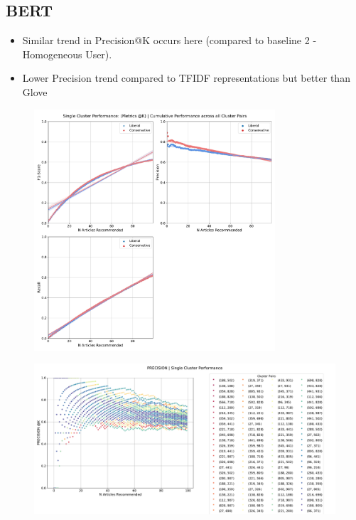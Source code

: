 \documentclass[a4paper,fontsize=8.0pt]{scrartcl}
\begin{document}
\subsection{BERT}
\begin{flushleft}
\begin{itemize}
    \item Similar trend in Precision@K occurs here (compared to baseline 2 - Homogeneous User). 
    \item  Lower Precision trend compared to TFIDF representations but better than Glove
\end{itemize}
\end{flushleft}
\begin{figure}[H]
 \includegraphics[width=0.8\textwidth]{Graphs/BERT/user_interaction_vs_model_performance_cumu_single_cluster.pdf}
\end{figure}
\begin{figure}[H]
 \includegraphics[width=1.0\textwidth]{Graphs/BERT/user_interaction_vs_model_performance_precision_all_cps_single_cluster.pdf}
\end{figure}
\end{document}
